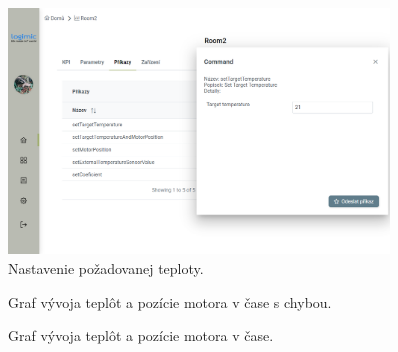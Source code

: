 \begin{figure}[H]
    \centering
    \includegraphics[width=0.9\textwidth]{obrazky-figures/setTarget.png}
    \caption{Nastavenie požadovanej teploty.}
    \label{fig:test_setTarget}
\end{figure}



\begin{figure}[H]
    \centering
    
    \caption{Graf vývoja teplôt a pozície motora v čase s chybou.}
    \label{fig:statisticGraph}
\end{figure}

\begin{figure}[H]
    \centering
    
    \caption{Graf vývoja teplôt a pozície motora v čase.}
    \label{fig:statisticGraph01}
\end{figure}